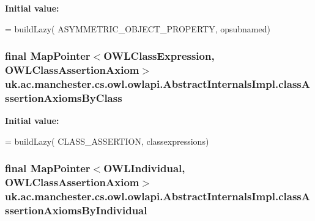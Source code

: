 {\bfseries Initial value\-:}
\begin{DoxyCode}
= buildLazy(
            ASYMMETRIC\_OBJECT\_PROPERTY, opsubnamed)
\end{DoxyCode}
\hypertarget{classuk_1_1ac_1_1manchester_1_1cs_1_1owl_1_1owlapi_1_1_abstract_internals_impl_a9af61f8573306403d4ccdd242b257c30}{
\subsubsection[{class\-Assertion\-Axioms\-By\-Class}]{\setlength{\rightskip}{0pt plus 5cm}final Map\-Pointer$<${\bf O\-W\-L\-Class\-Expression}, {\bf O\-W\-L\-Class\-Assertion\-Axiom}$>$ uk.\-ac.\-manchester.\-cs.\-owl.\-owlapi.\-Abstract\-Internals\-Impl.\-class\-Assertion\-Axioms\-By\-Class\hspace{0.3cm}{\ttfamily [protected]}}}\label{classuk_1_1ac_1_1manchester_1_1cs_1_1owl_1_1owlapi_1_1_abstract_internals_impl_a9af61f8573306403d4ccdd242b257c30}
{\bfseries Initial value\-:}
\begin{DoxyCode}
= buildLazy(
            CLASS\_ASSERTION, classexpressions)
\end{DoxyCode}
\hypertarget{classuk_1_1ac_1_1manchester_1_1cs_1_1owl_1_1owlapi_1_1_abstract_internals_impl_abbee76467173e02cb5d8bd078594ae63}{
\subsubsection[{class\-Assertion\-Axioms\-By\-Individual}]{\setlength{\rightskip}{0pt plus 5cm}final Map\-Pointer$<${\bf O\-W\-L\-Individual}, {\bf O\-W\-L\-Class\-Assertion\-Axiom}$>$ uk.\-ac.\-manchester.\-cs.\-owl.\-owlapi.\-Abstract\-Internals\-Impl.\-class\-Assertion\-Axioms\-By\-Individual\hspace{0.3cm}{\ttfamily [protected]}}}\label{classuk_1_1ac_1_1manchester_1_1cs_1_1owl_1_1owlapi_1_1_abstract_internals_impl_abbee76467173e02cb5d8bd078594ae63}
